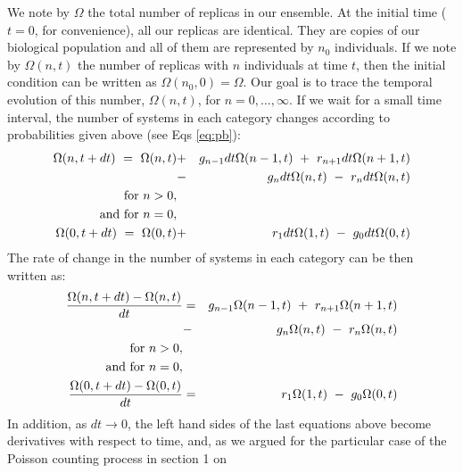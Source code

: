 We note by $\Omega$ the total number of replicas in our ensemble. At the initial time ($t=0$, for convenience), all our replicas are identical. They are copies of our biological population and all of them are represented by $n_0$ individuals. If we note by $\Omega(n,t)$ the number of replicas with $n$ individuals at time $t$, then the initial condition can be written as $\Omega(n_0,0)=\Omega$. Our goal is to trace the temporal evolution of this number, $\Omega(n,t)$, for $n=0, \dots, \infty$. If we wait for a small time interval, the number of systems in each category changes according to probabilities given above (see Eqs \ref{eq:pb}):
\begin{eqnarray}
\Omega(n,t+dt) \,\, = \,\, \Omega(n,t)  & + & g_{n-1} dt \Omega(n-1,t) \,\, + \,\, r_{n+1} dt \Omega(n+1,t) \nonumber \\
& - & g_n dt \Omega(n,t) \,\, - \,\,r_n dt \Omega(n,t)                  \nonumber \\
\textup{for} \,\, n > 0,      &
&                                                                       \nonumber\\       
\textup{and for} \,\, n = 0,  &   &                                                                       \nonumber \\
\Omega(0,t+dt) \,\, = \,\, \Omega(0,t)  & + & r_1 dt \Omega(1,t) \,\, - \,\, g_0 dt \Omega(0,t)             
\end{eqnarray}
The rate of change in the number of systems in each category can be then written as:
\begin{eqnarray}
\frac{\Omega(n,t+dt) - \Omega(n,t)}{dt} & = & g_{n-1} \Omega(n-1,t) \,\, + \,\, r_{n+1} \Omega(n+1,t) \nonumber \\
& - & g_n \Omega(n,t) \,\, - \,\, r_n  \Omega(n,t)            \nonumber \\
\textup{for} \,\, n > 0,                &   &                                                         \nonumber \\        
\textup{and for} \,\, n = 0,            &   &                                                         \nonumber \\
\frac{\Omega(0,t+dt) - \Omega(0,t)}{dt} & = & r_1  \Omega(1,t) \,\, - \,\, g_0 \Omega(0,t)             
\end{eqnarray}
In addition, as $dt \rightarrow 0$, the left hand sides of the last equations above become derivatives with respect to time, and, as we argued for the particular case of the Poisson counting process in section 1 on %
